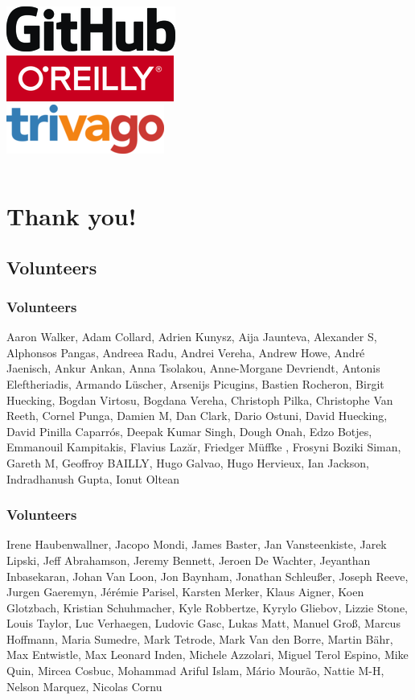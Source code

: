 \documentclass[aspectratio=169]{beamer}
\begin{document}
\begin{frame}
\begin{columns}[t]
		\includegraphics[scale=0.5]{images/github.png}\\
		\includegraphics[scale=0.4]{images/oreilly.png}\\
		\includegraphics[scale=0.4]{images/trivago.png}
	\end{columns}
\end{frame}

\section{Thank you!}

\subsection{Volunteers}

\begin{frame}
	\frametitle{Volunteers}
	Aaron Walker, Adam Collard, Adrien Kunysz, Aija Jaunteva, Alexander S, Alphonsos Pangas, Andreea Radu, Andrei Vereha, Andrew Howe, André Jaenisch, Ankur Ankan, Anna Tsolakou, Anne-Morgane Devriendt, Antonis Eleftheriadis, Armando Lüscher, Arsenijs Picugins, Bastien Rocheron, Birgit Huecking, Bogdan Virtosu, Bogdana Vereha, Christoph Pilka, Christophe Van Reeth, Cornel Punga, Damien M, Dan Clark, Dario Ostuni, David Huecking, David Pinilla Caparrós, Deepak Kumar Singh, Dough Onah, Edzo Botjes, Emmanouil Kampitakis, Flavius Lazăr, Friedger  Müffke , Frosyni Boziki Siman, Gareth M, Geoffroy BAILLY, Hugo Galvao, Hugo Hervieux, Ian Jackson, Indradhanush Gupta, Ionut Oltean
\end{frame}

\begin{frame}
	\frametitle{Volunteers}
	Irene Haubenwallner, Jacopo Mondi, James Baster, Jan Vansteenkiste, Jarek Lipski, Jeff Abrahamson, Jeremy Bennett, Jeroen De Wachter, Jeyanthan Inbasekaran, Johan Van Loon, Jon Baynham, Jonathan Schleußer, Joseph Reeve, Jurgen Gaeremyn, Jérémie Parisel, Karsten Merker, Klaus Aigner, Koen Glotzbach, Kristian Schuhmacher, Kyle Robbertze, Kyrylo Gliebov, Lizzie Stone, Louis Taylor, Luc Verhaegen, Ludovic Gasc, Lukas Matt, Manuel Groß, Marcus Hoffmann, Maria Sumedre, Mark Tetrode, Mark Van den Borre, Martin Bähr, Max Entwistle, Max Leonard Inden, Michele Azzolari, Miguel Terol Espino, Mike Quin, Mircea Cosbuc, Mohammad Ariful Islam, Mário Mourão, Nattie M-H, Nelson Marquez, Nicolas Cornu
\end{frame}
\end{document}
